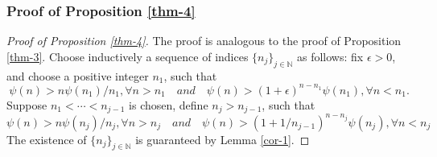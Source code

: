 \documentclass[12pt,reqno]{amsart}
\renewcommand{\=}{\coloneqq}
\theoremstyle{plain}
\begin{document}
\subsubsection{Proof of Proposition \ref{thm-4}}
\begin{proof}[Proof of Proposition \ref{thm-4}]
The proof is analogous to the proof of Proposition \ref{thm-3}. Choose inductively a sequence of indices $\{n_j\}_{j\in\mathbb{N}}$ as follows: fix $\epsilon>0$, and choose a positive integer $n_1$, such that
\begin{equation*}
\psi(n)>n \psi(n_1)/n_1, \forall n>n_1 \quad and \quad \psi(n) > (1+\epsilon)^{n-n_1} \psi(n_1), \forall n < n_1.
\end{equation*}
Suppose $n_1<\cdots<n_{j-1}$ is chosen, define $n_j>n_{j-1}$, such that
\begin{equation}\label{equ-metal}
\psi(n)>n \psi(n_j)/n_j, \forall n>n_j \quad and \quad \psi(n) > (1+1/n_{j-1})^{n-n_j} \psi(n_j), \forall n < n_j
\end{equation}
The existence of $\{n_j\}_{j\in\mathbb{N}}$ is guaranteed by Lemma \ref{cor-1}.


\end{proof}
\end{document}
